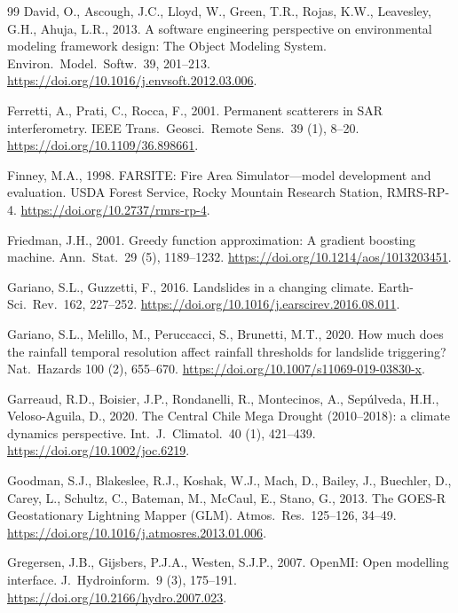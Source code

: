 \documentclass[authoryear,preprint,review,12pt]{elsarticle}
\begin{document}
\begin{thebibliography}{99}
David, O., Ascough, J.C., Lloyd, W., Green, T.R., Rojas, K.W., Leavesley, G.H.,
Ahuja, L.R., 2013. A software engineering perspective on environmental modeling
framework design: The Object Modeling System. Environ.\ Model.\ Softw.\ 39,
201--213. \url{https://doi.org/10.1016/j.envsoft.2012.03.006}.

Ferretti, A., Prati, C., Rocca, F., 2001. Permanent scatterers in SAR
interferometry. IEEE Trans.\ Geosci.\ Remote Sens.\ 39 (1), 8--20.
\url{https://doi.org/10.1109/36.898661}.

Finney, M.A., 1998. FARSITE: Fire Area Simulator---model development and
evaluation. USDA Forest Service, Rocky Mountain Research Station, RMRS-RP-4.
\url{https://doi.org/10.2737/rmrs-rp-4}.

Friedman, J.H., 2001. Greedy function approximation: A gradient boosting
machine. Ann.\ Stat.\ 29 (5), 1189--1232.
\url{https://doi.org/10.1214/aos/1013203451}.

Gariano, S.L., Guzzetti, F., 2016. Landslides in a changing climate.
Earth-Sci.\ Rev.\ 162, 227--252.
\url{https://doi.org/10.1016/j.earscirev.2016.08.011}.

Gariano, S.L., Melillo, M., Peruccacci, S., Brunetti, M.T., 2020. How much does
the rainfall temporal resolution affect rainfall thresholds for landslide
triggering? Nat.\ Hazards 100 (2), 655--670.
\url{https://doi.org/10.1007/s11069-019-03830-x}.

Garreaud, R.D., Boisier, J.P., Rondanelli, R., Montecinos, A., Sep\'ulveda, H.H.,
Veloso-Aguila, D., 2020. The Central Chile Mega Drought (2010--2018): a climate
dynamics perspective. Int.\ J.\ Climatol.\ 40 (1), 421--439.
\url{https://doi.org/10.1002/joc.6219}.

Goodman, S.J., Blakeslee, R.J., Koshak, W.J., Mach, D., Bailey, J., Buechler, D.,
Carey, L., Schultz, C., Bateman, M., McCaul, E., Stano, G., 2013. The GOES-R
Geostationary Lightning Mapper (GLM). Atmos.\ Res.\ 125--126, 34--49.
\url{https://doi.org/10.1016/j.atmosres.2013.01.006}.

Gregersen, J.B., Gijsbers, P.J.A., Westen, S.J.P., 2007. OpenMI: Open modelling
interface. J.\ Hydroinform.\ 9 (3), 175--191.
\url{https://doi.org/10.2166/hydro.2007.023}.


\end{thebibliography}
\end{document}
